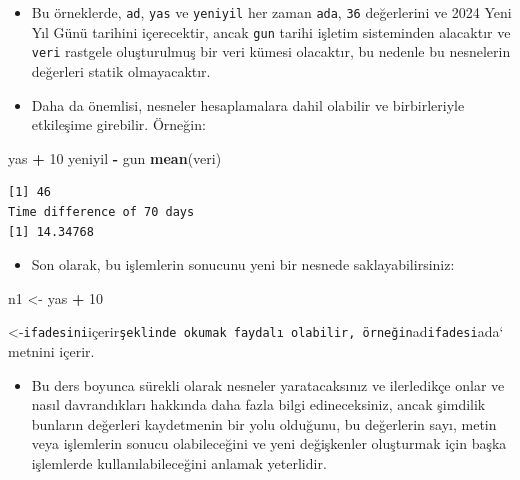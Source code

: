 \documentclass[
  oneside]{book}
\newenvironment{Shaded}{\begin{snugshade}}{\end{snugshade}}
\newcommand{\DecValTok}[1]{\textcolor[rgb]{0.00,0.00,0.81}{#1}}
\newcommand{\FunctionTok}[1]{\textcolor[rgb]{0.13,0.29,0.53}{\textbf{#1}}}
\newcommand{\NormalTok}[1]{#1}
\newcommand{\OtherTok}[1]{\textcolor[rgb]{0.56,0.35,0.01}{#1}}
\newcommand{\SpecialCharTok}[1]{\textcolor[rgb]{0.81,0.36,0.00}{\textbf{#1}}}
\providecommand{\tightlist}{%
  \setlength{\itemsep}{0pt}\setlength{\parskip}{0pt}}
\begin{document}
\begin{itemize}
\item
  Bu örneklerde, \texttt{ad}, \texttt{yas} ve \texttt{yeniyil} her zaman \texttt{ada}, \texttt{36} değerlerini ve 2024 Yeni Yıl Günü tarihini içerecektir, ancak \texttt{gun} tarihi işletim sisteminden alacaktır ve \texttt{veri} rastgele oluşturulmuş bir veri kümesi olacaktır, bu nedenle bu nesnelerin değerleri statik olmayacaktır.
\item
  Daha da önemlisi, nesneler hesaplamalara dahil olabilir ve birbirleriyle etkileşime girebilir. Örneğin:
\end{itemize}

\begin{Shaded}
\begin{Highlighting}[]
\NormalTok{yas }\SpecialCharTok{+} \DecValTok{10}
\NormalTok{yeniyil }\SpecialCharTok{{-}}\NormalTok{ gun}
\FunctionTok{mean}\NormalTok{(veri)}
\end{Highlighting}
\end{Shaded}

\begin{verbatim}
[1] 46
Time difference of 70 days
[1] 14.34768
\end{verbatim}

\begin{itemize}
\tightlist
\item
  Son olarak, bu işlemlerin sonucunu yeni bir nesnede saklayabilirsiniz:
\end{itemize}

\begin{Shaded}
\begin{Highlighting}[]
\NormalTok{n1 }\OtherTok{\textless{}{-}}\NormalTok{ yas }\SpecialCharTok{+} \DecValTok{10}
\end{Highlighting}
\end{Shaded}

\begin{try}
\textless-\texttt{ifadesini}içerir\texttt{şeklinde\ okumak\ faydalı\ olabilir,\ örneğin}ad\texttt{ifadesi}ada`
metnini içerir.
\end{try}

\begin{itemize}
\tightlist
\item
  Bu ders boyunca sürekli olarak nesneler yaratacaksınız ve ilerledikçe onlar ve nasıl davrandıkları hakkında daha fazla bilgi edineceksiniz, ancak şimdilik bunların değerleri kaydetmenin bir yolu olduğunu, bu değerlerin sayı, metin veya işlemlerin sonucu olabileceğini ve yeni değişkenler oluşturmak için başka işlemlerde kullanılabileceğini anlamak yeterlidir.
\end{itemize}
\end{document}
